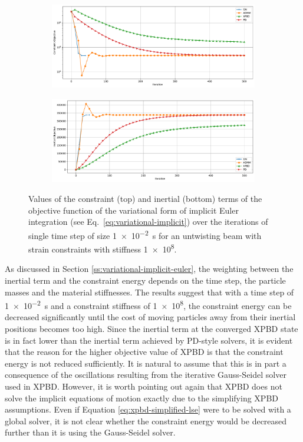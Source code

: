 \begin{figure}[h]
    \centering
    \begin{subfigure}{\textwidth}
        \includegraphics[width=\linewidth]{figures/strain_beam_untwist_constraintObjectives.pdf}
    \end{subfigure}
    \begin{subfigure}{\textwidth}
        \includegraphics[width=\linewidth]{figures/strain_beam_untwist_inertialObjectives.pdf}
    \end{subfigure}
    \caption{Values of the constraint (top) and inertial (bottom) terms of the objective function of the variational form of implicit Euler integration 
        (see Eq.\ \ref{eq:variational-implicit}) over the iterations of single time step of size \SI{1e-2}{\second} for an untwisting beam with strain 
    constraints with stiffness \num{1e8}.}
    \label{fig:strain-beam-untwist-objectives-split}
\end{figure}

As discussed in Section \ref{ss:variational-implicit-euler}, the weighting between the inertial term and the constraint energy depends on the time step, the particle masses 
and the material stiffnesses. The results suggest that with a time step of \SI{1e-2}{\second} and a constraint stiffness of \num{1e8}, the constraint energy can be 
decreased significantly until the cost of moving particles away from their inertial positions becomes too high. Since the inertial term at the converged XPBD state 
is in fact lower than the inertial term achieved by PD-style solvers, it is evident that the reason for the 
higher objective value of XPBD is that the constraint energy is not reduced sufficiently. It is natural to assume that this 
is in part a consequence of the oscillations resulting from the iterative Gauss-Seidel solver used in XPBD. However, it is worth pointing out again that XPBD does not 
solve the implicit equations of motion exactly due to the simplifying XPBD assumptions. Even if Equation \ref{eq:xpbd-simplified-lse} were to be solved with a global solver,
it is not clear whether the constraint energy would be decreased further than it is using the Gauss-Seidel solver. 

